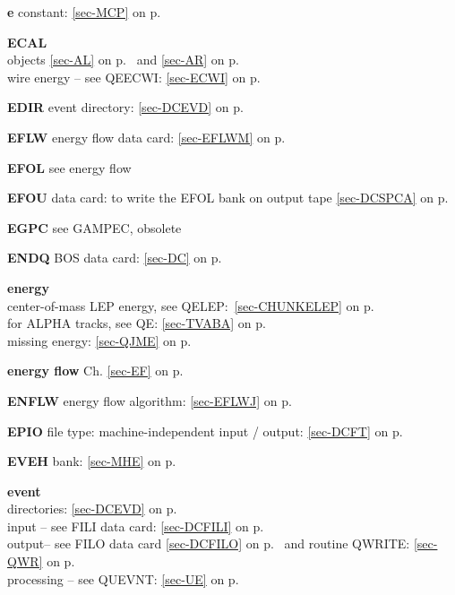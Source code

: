  \item{\bf e   }constant: \ref{sec-MCP} on p.~\pageref{sec-MCP}\\
 \item{\bf ECAL}\\
 \subitem objects \ref{sec-AL} on p.~\pageref{sec-AL} and
 \ref{sec-AR} on p.~\pageref{sec-AR}\\
 \subitem wire energy -- see QEECWI: \ref{sec-ECWI} on p.~\pageref{sec-ECWI}\\
 \item{\bf EDIR    }event directory: \ref{sec-DCEVD} on p.~\pageref{sec-DCEVD}\\
 \item{\bf EFLW    }energy flow data card: \ref{sec-EFLWM} on p.~\pageref{sec-EFLWM}\\
 \item{\bf EFOL    }see energy flow\\
 \item{\bf EFOU    }data card: to write the EFOL bank on output tape
 \ref{sec-DCSPCA} on p.~\pageref{sec-DCSPCA}\\
 \item{\bf EGPC    }see GAMPEC, obsolete\\
 \item{\bf ENDQ    }BOS data card: \ref{sec-DC} on p.~\pageref{sec-DC}\\
 \item{\bf energy  }\\
 \subitem center-of-mass LEP energy, see QELEP:~\ref{sec-CHUNKELEP} on p.~\pageref{sec-CHUNKELEP}\\
 \subitem for ALPHA tracks,
 see QE: \ref{sec-TVABA} on p.~\pageref{sec-TVABA}\\
 \subitem missing energy: \ref{sec-QJME} on p.~\pageref{sec-QJME}\\
 \item{\bf energy flow }Ch. \ref{sec-EF} on p.~\pageref{sec-EF}\\
 \item{\bf ENFLW }energy flow algorithm: \ref{sec-EFLWJ} on p.~\pageref{sec-EFLWJ}\\
 \item{\bf EPIO    }file type: machine-independent input / output:
 \ref{sec-DCFT} on p.~\pageref{sec-DCFT}\\
 \item{\bf EVEH    }bank: \ref{sec-MHE} on p.~\pageref{sec-MHE}\\
 \item{\bf event }\\
 \subitem directories: \ref{sec-DCEVD} on p.~\pageref{sec-DCEVD}\\
 \subitem input -- see FILI data card: \ref{sec-DCFILI} on p.~\pageref{sec-DCFILI}\\
 \subitem output-- see FILO data card \ref{sec-DCFILO} on p.~\pageref{sec-DCFILO}
 and routine QWRITE: \ref{sec-QWR} on p.~\pageref{sec-QWR}\\
 \subitem processing -- see QUEVNT: \ref{sec-UE} on p.~\pageref{sec-UE}
 
